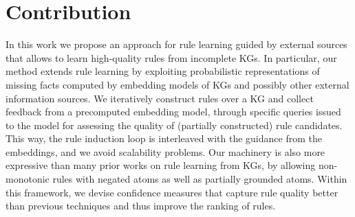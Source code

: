 \section{Contribution}
In this work we propose an approach for rule learning guided by external sources
that allows to learn high-quality rules from incomplete KGs.
In particular, our method extends rule learning
by exploiting probabilistic representations of missing facts 
computed by embedding models of KGs and possibly other external information sources. 
We iteratively construct rules over a KG 
and collect feedback from a precomputed embedding model, 
through specific queries issued to the model 
for assessing the quality of (partially constructed) rule candidates. 
%
%
This way, the rule induction loop is interleaved with the guidance from the embeddings,
and we avoid scalability problems.
Our machinery is also more expressive than many prior works on rule learning from KGs,
by allowing non-monotonic rules with negated atoms as well as partially grounded atoms. 
Within this framework, we devise confidence measures that capture rule quality
better than previous techniques and thus improve the ranking of rules.

